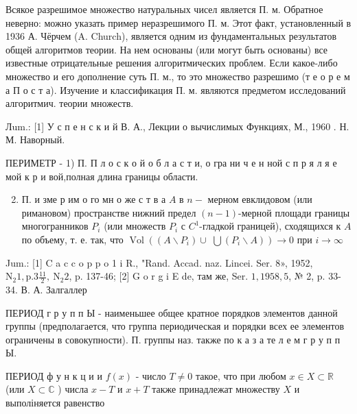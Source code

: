 \documentclass[10pt]{article}
\begin{document}
Всякое разрешимое множество натуральных чисел является П. м. Обратное неверно: можно указать пример неразрешимого П. м. Этот факт, установленный в 1936 А. Чёрчем (A. Church), является одним из фундаментальных результатов общей алгоритмов теории. На нем основаны (или могут быть основаны) все известные отрицательные решения алгоритмических проблем. Если какое-либо множество и его дополнение суть П. м., то это множество разрешимо (т е о р е м а П о с т а). Изучение и классификация П. м. являются предметом исследований алгоритмич. теории множеств.



Лum.: [1] У с п е н с к и й В. А., Лекции о вычислимых Функциях, М., 1960 . Н. М. Наворный.



ПЕРИМЕТР - 1) П. П л о с к о й $о$ б л а с т и, о гра ни ч е н ной с п р я л я е мой к р и вой,полная длина границы области.



\begin{enumerate}

  \setcounter{enumi}{1}

  \item П. и зме р им о го мн о же с т в а $A$ в $n-$ мерном евклидовом (или римановом) пространстве нижний предел $(n-1)$-мерной площади границы многогранников $P_{i}$ (или множеств $P_{i}$ с $C^{1}$-гладкой границей), сходящихся к $A$ по объему, т. е. так, что $\operatorname{Vol}\left(\left(A \backslash P_{i}\right) \cup\right.$ $\left.\bigcup\left(P_{i} \backslash A\right)\right) \rightarrow 0$ при $i \rightarrow \infty$

\end{enumerate}



Jum.: [1] C a c c o p p o 1 i R., "Rand. Accad. naz. Lincei. Ser. 8», 1952, $\mathrm{N}_{2} 1, \mathrm{p} .3 \frac{11}{2}, \mathrm{~N}_{2} 2$, p. 137-46; [2] G o r g i E de, там же, Ser. $1,1958,5$, № 2, p. 33-34. В. А. Залгаллер



ПЕРИОД г р у п п Ы - наименьшее общее кратное порядков элементов данной группы (предполагается, что группа периодическая и порядки всех ее элементов ограничены в совокупности). П. группы наз. также по к а з а те л е м г р у п п Ы.



ПЕРИОД ф у н к ц и и $f(x)$ - число $T \neq 0$ такое, что при любом $x \in X \subset \mathbb{R}$ (или $X \subset \mathbb{C}$ ) числа $x-T$ и $x+T$ также принадлежат множеству $X$ и выполіняется равенство
\end{document}
